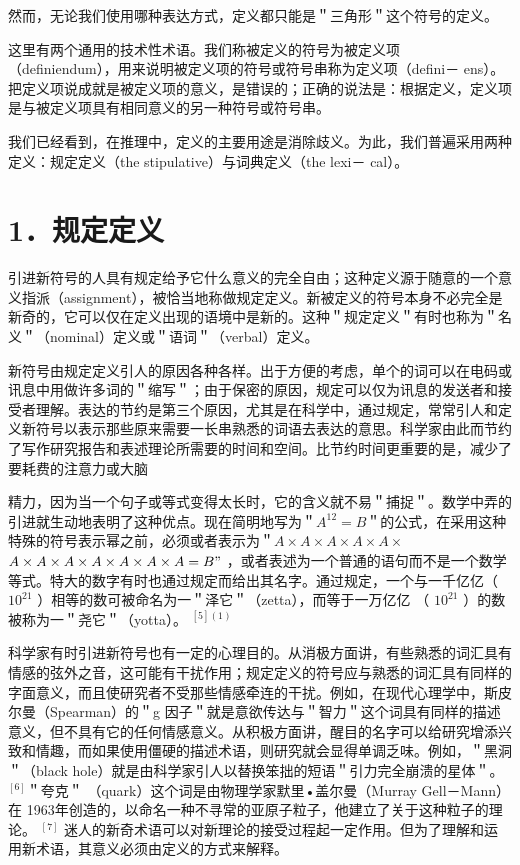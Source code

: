 然而，无论我们使用哪种表达方式，定义都只能是＂三角形＂这个符号的定义。

这里有两个通用的技术性术语。我们称被定义的符号为被定义项 （definiendum），用来说明被定义项的符号或符号串称为定义项（defini－ ens）。把定义项说成就是被定义项的意义，是错误的；正确的说法是：根据定义，定义项是与被定义项具有相同意义的另一种符号或符号串。

我们已经看到，在推理中，定义的主要用途是消除歧义。为此，我们普遍采用两种定义：规定定义（the stipulative）与词典定义（the lexi－ cal）。

\section*{1．规定定义}
引进新符号的人具有规定给予它什么意义的完全自由；这种定义源于随意的一个意义指派（assignment），被恰当地称做规定定义。新被定义的符号本身不必完全是新奇的，它可以仅在定义出现的语境中是新的。这种＂规定定义＂有时也称为＂名义＂（nominal）定义或＂语词＂（verbal）定义。

新符号由规定定义引人的原因各种各样。出于方便的考虑，单个的词可以在电码或讯息中用做许多词的＂缩写＂；由于保密的原因，规定可以仅为讯息的发送者和接受者理解。表达的节约是第三个原因，尤其是在科学中，通过规定，常常引人和定义新符号以表示那些原来需要一长串熟悉的词语去表达的意思。科学家由此而节约了写作研究报告和表述理论所需要的时间和空间。比节约时间更重要的是，减少了要耗费的注意力或大脑

精力，因为当一个句子或等式变得太长时，它的含义就不易＂捕捉＂。数学中弄的引进就生动地表明了这种优点。现在简明地写为＂$A^{12}=B$＂的公式，在采用这种特殊的符号表示幂之前，必须或者表示为＂$A \times A \times A \times A \times A \times$ $A \times A \times A \times A \times A \times A \times A=B "$ ，或者表述为一个普通的语句而不是一个数学等式。特大的数字有时也通过规定而给出其名字。通过规定，一个与一千亿亿（ $10^{21}$ ）相等的数可被命名为一＂泽它＂（zetta），而等于一万亿亿 （ $10^{21}$ ）的数被称为一＂尧它＂（yotta）。 ${ }^{[5](1)}$

科学家有时引进新符号也有一定的心理目的。从消极方面讲，有些熟悉的词汇具有情感的弦外之音，这可能有干扰作用；规定定义的符号应与熟悉的词汇具有同样的字面意义，而且使研究者不受那些情感牵连的干扰。例如，在现代心理学中，斯皮尔曼（Spearman）的＂g 因子＂就是意欲传达与＂智力＂这个词具有同样的描述意义，但不具有它的任何情感意义。从积极方面讲，醒目的名字可以给研究增添兴致和情趣，而如果使用僵硬的描述术语，则研究就会显得单调乏味。例如，＂黑洞＂（black hole）就是由科学家引人以替换笨拙的短语＂引力完全崩溃的星体＂。 ${ }^{[6]}$＂夸克＂ （quark）这个词是由物理学家默里•盖尔曼（Murray Gell－Mann）在 1963年创造的，以命名一种不寻常的亚原子粒子，他建立了关于这种粒子的理论。 ${ }^{[7]}$ 迷人的新奇术语可以对新理论的接受过程起一定作用。但为了理解和运用新术语，其意义必须由定义的方式来解释。

